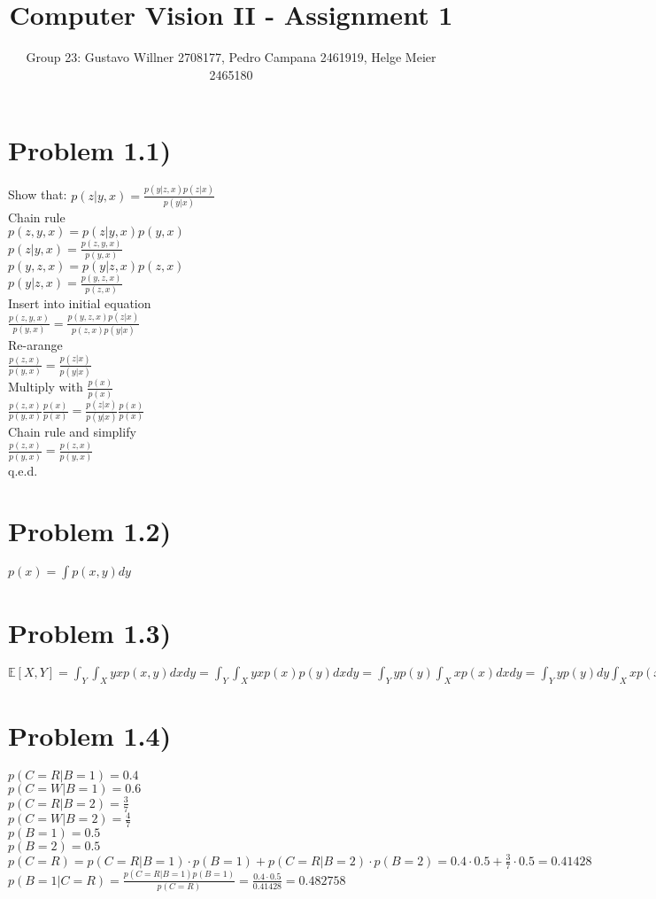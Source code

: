 \documentclass[11pt]{article} %
\title{Computer Vision II - Assignment 1}
\author{Group 23: Gustavo Willner 2708177, Pedro Campana 2461919, Helge Meier 2465180}
\date{}
\begin{document}
	\maketitle
	
	\section*{Problem 1.1)}
	Show that: $p(z \lvert y,x) = \frac{p(y \lvert z,x)p(z \lvert x)}{p(y \lvert x)}$\\
	Chain rule\\
	$p(z,y,x) = p(z \lvert y,x) p(y,x)$\\
	$p(z \lvert y,x) = \frac{p(z,y,x)}{p(y,x)} $\\
	$p(y,z,x) = p(y \lvert z,x) p(z,x)$\\
	$p(y \lvert z,x) = \frac{p(y,z,x)}{p(z,x)} $\\
	Insert into initial equation\\
	$\frac{p(z,y,x)}{p(y,x)}  = \frac{p(y,z,x)p(z \lvert x)}{p(z,x) p(y \lvert x)} $\\
	Re-arange\\
	$\frac{p(z,x)}{p(y,x)}  = \frac{p(z \lvert x)}{p(y \lvert x)} $\\
	Multiply with $\frac{p(x)}{p(x)}$\\
	$\frac{p(z,x)}{p(y,x)}\frac{p(x)}{p(x)}  = \frac{p(z \lvert x)}{p(y \lvert x)}\frac{p(x)}{p(x)} $\\
	Chain rule and simplify\\
	$\frac{p(z,x)}{p(y,x)}  = \frac{p(z , x)}{p(y , x)} $\\
	q.e.d.
	\section*{Problem 1.2)}
	$p(x) = \int p(x,y) dy$
	\section*{Problem 1.3)}
	$\mathbb{E}\left[X,Y\right] = \int_{Y} \int_{X} yxp(x,y) dxdy = \int_{Y} \int_{X} yxp(x)p(y) dxdy = \int_{Y} yp(y) \int_{X} xp(x) dxdy = \int_{Y} yp(y) dy\int_{X} xp(x) dx = \mathbb{E}\left[Y\right]\mathbb{E}\left[X\right]$\\
	\section*{Problem 1.4)}
	$p(C=R \lvert B=1) = 0.4$\\
	$p(C=W \lvert B=1) = 0.6$\\
	$p(C=R \lvert B=2) = \frac{3}{7}$\\
	$p(C=W \lvert B=2) = \frac{4}{7}$\\
	$p(B=1) = 0.5$\\
	$p(B=2) = 0.5$\\
	$p(C=R) = p(C=R \lvert B=1) \cdot p(B=1) + p(C=R \lvert B=2) \cdot p(B=2) = 0.4 \cdot 0.5 + \frac{3}{7}\cdot 0.5 = 0.41428$\\
	$p(B=1 \lvert C=R) = \frac{p(C=R \lvert B=1)p(B=1)}{p(C=R)} = \frac{0.4 \cdot 0.5}{0.41428} = 0.482758$\\
\end{document}

